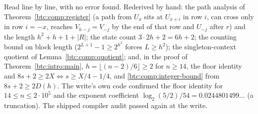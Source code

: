 \begin{writenote}
Read line by line, with no error found. Rederived by hand: the path analysis
of Theorem~\ref{btc:comp:register} (a path from $U_x$ sits at $U_{x+i}$ in row
$i$, can cross only in row $i=-x$, reaches $V_{h-j}=V_{-j}$ by the end of that
row and $U_{-j}$ after $r$) and the length $h^2+h+1+|R|$; the state count
$3\cdot2h+2=6h+2$; the counting bound on block length ($2^{L+1}-1\ge2^{h^2}$
forces $L\ge h^2$); the singleton-context quotient of
Lemma~\ref{btc:comp:quotient}; and, in the proof of
Theorem~\ref{btc:intro:main}, $h=\lfloor(n-2)/6\rfloor\ge2$ for $n\ge14$,
the floor identity and $8s+2\ge2X\Leftrightarrow s\ge X/4-1/4$, and
\eqref{btc:comp:integer-bound} from $8s+2\ge2D(h)$. The write's own code
confirmed the floor identity for $14\le n\le2\cdot10^5$ and the exponent
coefficient $\log_2(5/2)/54=0.0244801499\ldots$ (a truncation). The shipped
compiler audit passed again at the write.
\end{writenote}
